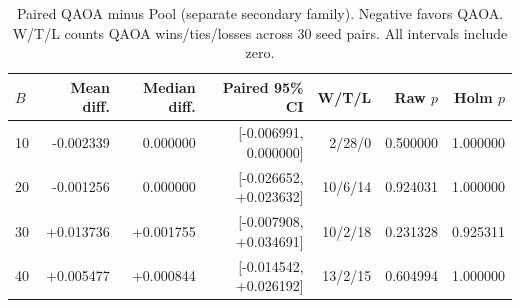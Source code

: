 \begin{table}[htbp]\centering
\caption{Paired QAOA minus Pool (separate secondary family). Negative favors QAOA. W/T/L counts QAOA wins/ties/losses across 30 seed pairs. All intervals include zero.}\label{tab:paired_pool}
\scriptsize
\setlength{\tabcolsep}{4pt}
\begin{tabular}{lrrrrrr}\toprule
$B$ & Mean diff. & Median diff. & Paired 95\% CI & W/T/L & Raw $p$ & Holm $p$ \\ \midrule
10 & -0.002339 & 0.000000 & [-0.006991, 0.000000] & 2/28/0 & 0.500000 & 1.000000 \\
20 & -0.001256 & 0.000000 & [-0.026652, +0.023632] & 10/6/14 & 0.924031 & 1.000000 \\
30 & +0.013736 & +0.001755 & [-0.007908, +0.034691] & 10/2/18 & 0.231328 & 0.925311 \\
40 & +0.005477 & +0.000844 & [-0.014542, +0.026192] & 13/2/15 & 0.604994 & 1.000000 \\
\bottomrule\end{tabular}
\end{table}
